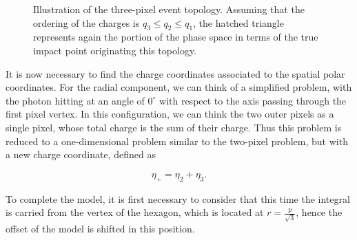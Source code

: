 \begin{figure}[htbp]
    \centering
    \caption{Illustration of the three-pixel event topology. Assuming that the ordering
    of the charges is $q_3 \leq q_2 \leq q_1$, the hatched triangle represents again the 
    portion of the phase space in terms of the true impact point originating this topology.}
    \label{fig:three_pixel_event}
\end{figure}

It is now necessary to find the charge coordinates associated to the spatial polar coordinates. For the radial component, we can think of a simplified problem, with the photon hitting at an angle of $0^{\circ}$ with respect to the axis passing through the first pixel vertex. In this configuration, we can think the two outer pixels as a single pixel, whose total charge is the sum of their charge. Thus this problem is reduced to a one-dimensional problem similar to the two-pixel problem, but with a new charge coordinate, defined as

\begin{equation}
\eta_+ = \eta_2 + \eta_3.
\end{equation}

To complete the model, it is first necessary to consider that this time the integral is carried from the vertex of the hexagon, which is located at $r=\frac{p}{\sqrt{3}}$, hence the offset of the model is shifted in this position.

